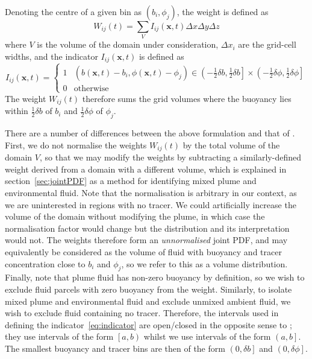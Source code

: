 \documentclass[a4paper]{article}
\begin{document}
Denoting the centre of a given bin as $(b_i, \phi_j)$, the weight is defined as
\begin{equation}
	W_{ij}(t) = \sum_V I_{ij}(\bm{x},t) \Delta x \Delta y \Delta z
\end{equation}
where $V$ is the volume of the domain under consideration, $\Delta x_i$ are the grid-cell widths, and the
indicator $I_{ij}(\bm{x},t)$ is defined as
\begin{equation}
	I_{ij}(\bm{x}, t) = \begin{cases}
		1 & \left(b(\bm{x},t) - b_i, \phi(\bm{x},t) - \phi_j\right) \in \left( -\frac{1}{2}\delta b,
		\frac{1}{2}\delta b \right] \times \left( -\frac{1}{2}\delta \phi, \frac{1}{2}\delta \phi \right] \\
			0 & \text{otherwise}
		\end{cases}
		\label{eq:indicator}
\end{equation}
The weight $W_{ij}(t)$ therefore sums the grid volumes where the buoyancy lies within $\frac{1}{2}\delta b$ of
$b_i$ and $\frac{1}{2}\delta \phi$ of $\phi_j$.

There are a number of differences between the above formulation and that of \citet{penney2020}. First, we do
not normalise the weights $W_{ij}(t)$ by the total volume of the domain $V$, so that we may modify the weights
by subtracting a similarly-defined weight derived from a domain with a different volume, which is explained in
section~\ref{sec:jointPDF} as a method for identifying mixed plume and environmental fluid. Note that the
normalisation is arbitrary in our context, as we are uninterested in regions with no tracer. We could
artificially increase the volume of the domain without modifying the plume, in which case the normalisation
factor would change but the distribution and its interpretation would not. The weights therefore form an
\emph{unnormalised} joint PDF, and may equivalently be considered as the volume of fluid with buoyancy and
tracer concentration close to $b_i$ and $\phi_j$, so we refer to this as a volume distribution. Finally, note
that plume fluid has non-zero buoyancy by definition, so we wish to exclude fluid parcels with zero buoyancy
from the weight. Similarly, to isolate mixed plume and environmental fluid and exclude unmixed ambient fluid,
we wish to exclude fluid containing no tracer. Therefore, the intervals used in defining the
indicator~\eqref{eq:indicator} are open/closed in the opposite sense to \citet{penney2020}; they use intervals
of the form $\left[a, b\right)$ whilst we use intervals of the form $\left(a, b\right]$. The smallest buoyancy
and tracer bins are then of the form $\left(0, \delta b\right]$ and $\left(0, \delta \phi\right]$. 
\end{document}

